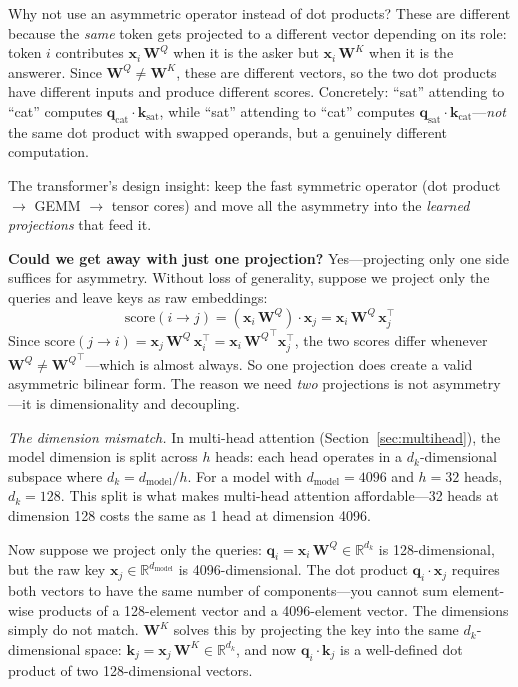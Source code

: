 \begin{whynotbox}{Why not use an asymmetric operator instead of dot products?}
These are different because the \emph{same} token gets projected to a different vector depending on its role: token $i$ contributes $\mathbf{x}_i\, \mathbf{W}^Q$ when it is the asker but $\mathbf{x}_i\, \mathbf{W}^K$ when it is the answerer. Since $\mathbf{W}^Q \neq \mathbf{W}^K$, these are different vectors, so the two dot products have different inputs and produce different scores. Concretely: ``sat'' attending to ``cat'' computes $\mathbf{q}_{\text{cat}} \cdot \mathbf{k}_{\text{sat}}$, while ``sat'' attending to ``cat'' computes $\mathbf{q}_{\text{sat}} \cdot \mathbf{k}_{\text{cat}}$---\emph{not} the same dot product with swapped operands, but a genuinely different computation.

The transformer's design insight: keep the fast symmetric operator (dot product $\to$ GEMM $\to$ tensor cores) and move all the asymmetry into the \emph{learned projections} that feed it.

\textbf{Could we get away with just one projection?} Yes---projecting only one side suffices for asymmetry. Without loss of generality, suppose we project only the queries and leave keys as raw embeddings:
\[
\text{score}(i \to j) = (\mathbf{x}_i\, \mathbf{W}^Q) \cdot \mathbf{x}_j = \mathbf{x}_i\, \mathbf{W}^Q\, \mathbf{x}_j^\top
\]
Since $\text{score}(j \to i) = \mathbf{x}_j\, \mathbf{W}^Q\, \mathbf{x}_i^\top = \mathbf{x}_i\, {\mathbf{W}^Q}^\top \mathbf{x}_j^\top$, the two scores differ whenever $\mathbf{W}^Q \neq {\mathbf{W}^Q}^\top$---which is almost always. So one projection does create a valid asymmetric bilinear form. The reason we need \emph{two} projections is not asymmetry---it is dimensionality and decoupling.

\emph{The dimension mismatch.} In multi-head attention (Section~\ref{sec:multihead}), the model dimension is split across $h$ heads: each head operates in a $d_k$-dimensional subspace where $d_k = d_{\text{model}}/h$. For a model with $d_{\text{model}} = 4096$ and $h = 32$ heads, $d_k = 128$. This split is what makes multi-head attention affordable---32 heads at dimension 128 costs the same as 1 head at dimension 4096.

Now suppose we project only the queries: $\mathbf{q}_i = \mathbf{x}_i\, \mathbf{W}^Q \in \mathbb{R}^{d_k}$ is 128-dimensional, but the raw key $\mathbf{x}_j \in \mathbb{R}^{d_{\text{model}}}$ is 4096-dimensional. The dot product $\mathbf{q}_i \cdot \mathbf{x}_j$ requires both vectors to have the same number of components---you cannot sum element-wise products of a 128-element vector and a 4096-element vector. The dimensions simply do not match. $\mathbf{W}^K$ solves this by projecting the key into the same $d_k$-dimensional space: $\mathbf{k}_j = \mathbf{x}_j\, \mathbf{W}^K \in \mathbb{R}^{d_k}$, and now $\mathbf{q}_i \cdot \mathbf{k}_j$ is a well-defined dot product of two 128-dimensional vectors.


\end{whynotbox}
